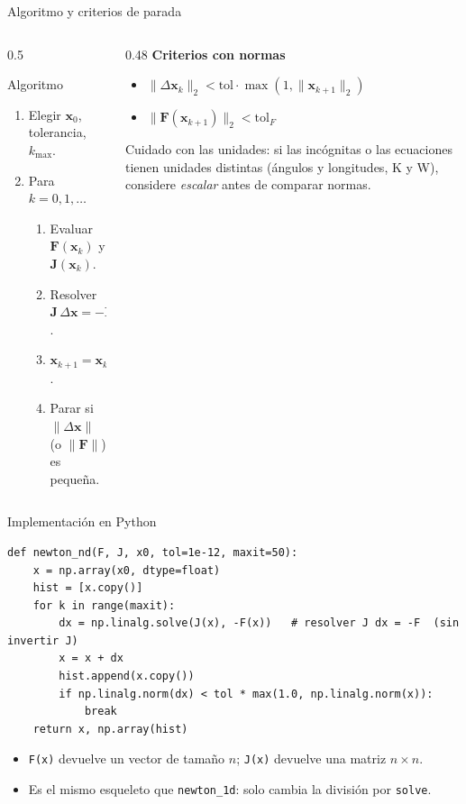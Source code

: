 \documentclass[aspectratio=169,11pt]{beamer}
\newcommand{\vect}[1]{\mathbf{#1}}
\newcommand{\Jac}{\mathbf{J}}
\begin{document}
\begin{frame}{Algoritmo y criterios de parada}
  \begin{columns}[T]
    \begin{column}{0.5\textwidth}
      \begin{block}{Algoritmo}
        \begin{enumerate}
          \item Elegir $\vect x_0$, tolerancia, $k_{\max}$.
          \item Para $k=0,1,\dots$
          \begin{enumerate}
            \item Evaluar $\vect F(\vect x_k)$ y $\Jac(\vect x_k)$.
            \item Resolver $\Jac\,\Delta\vect x=-\vect F$.
            \item $\vect x_{k+1}=\vect x_k+\Delta\vect x$.
            \item Parar si $\|\Delta\vect x\|$ (o $\|\vect F\|$) es pequeña.
          \end{enumerate}
        \end{enumerate}
      \end{block}
    \end{column}
    \begin{column}{0.48\textwidth}
      \textbf{Criterios con normas}
      \begin{itemize}
        \item $\|\Delta\vect x_k\|_2<\text{tol}\cdot\max(1,\|\vect x_{k+1}\|_2)$
        \item $\|\vect F(\vect x_{k+1})\|_2<\text{tol}_F$
      \end{itemize}
      \medskip
      \alert{Cuidado con las unidades:} si las incógnitas o las ecuaciones tienen unidades distintas (ángulos y longitudes, K y W), considere \emph{escalar} antes de comparar normas.
    \end{column}
  \end{columns}
\end{frame}

\begin{frame}[fragile]{Implementación en Python}
\begin{lstlisting}
def newton_nd(F, J, x0, tol=1e-12, maxit=50):
    x = np.array(x0, dtype=float)
    hist = [x.copy()]
    for k in range(maxit):
        dx = np.linalg.solve(J(x), -F(x))   # resolver J dx = -F  (sin invertir J)
        x = x + dx
        hist.append(x.copy())
        if np.linalg.norm(dx) < tol * max(1.0, np.linalg.norm(x)):
            break
    return x, np.array(hist)
\end{lstlisting}
  \begin{itemize}
    \item \texttt{F(x)} devuelve un vector de tamaño $n$; \texttt{J(x)} devuelve una matriz $n\times n$.
    \item Es el mismo esqueleto que \texttt{newton\_1d}: solo cambia la división por \texttt{solve}.
  \end{itemize}
\end{frame}
\end{document}

